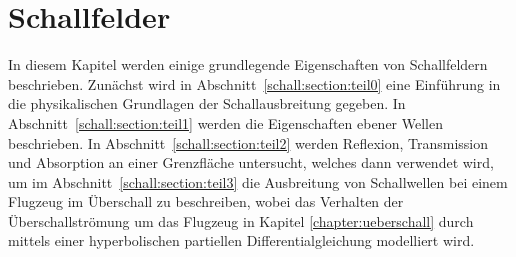 %
%
%
%
\chapter{Schallfelder\label{chapter:schall}}
\begin{refsection}

\begin{comment}
Ein paar Hinweise für die korrekte Formatierung des Textes
\begin{itemize}
\item
Absätze werden gebildet, indem man eine Leerzeile einfügt.
Die Verwendung von \verb+\\+ ist nur in Tabellen und Arrays gestattet.
\item
Die explizite Platzierung von Bildern ist nicht erlaubt, entsprechende
Optionen werden gelöscht. 
Verwenden Sie Labels und Verweise, um auf Bilder hinzuweisen.
\item
Beginnen Sie jeden Satz auf einer neuen Zeile. 
Damit ermöglichen Sie dem Versionsverwaltungssysteme, Änderungen
in verschiedenen Sätzen von verschiedenen Autoren ohne Konflikt 
anzuwenden.
\item 
Bilden Sie auch für Formeln kurze Zeilen, einerseits der besseren
Übersicht wegen, aber auch um GIT die Arbeit zu erleichtern.
\end{itemize}

\end{comment}

In diesem Kapitel werden einige grundlegende Eigenschaften von
Schallfeldern beschrieben.
Zunächst wird in Abschnitt~\ref{schall:section:teil0} eine Einführung
in die physikalischen Grundlagen der Schallausbreitung gegeben.
In Abschnitt~\ref{schall:section:teil1} werden die Eigenschaften
ebener Wellen beschrieben.
In Abschnitt~\ref{schall:section:teil2} werden Reflexion, Transmission
und Absorption an einer Grenzfläche untersucht, welches dann verwendet
wird, um im Abschnitt~\ref{schall:section:teil3} die Ausbreitung
von Schallwellen bei einem Flugzeug im Überschall zu beschreiben, wobei
das Verhalten der Überschallströmung um das Flugzeug in Kapitel
\ref{chapter:ueberschall} durch mittels einer hyperbolischen
partiellen Differentialgleichung modelliert wird.






\printbibliography[heading=subbibliography]
\end{refsection}
